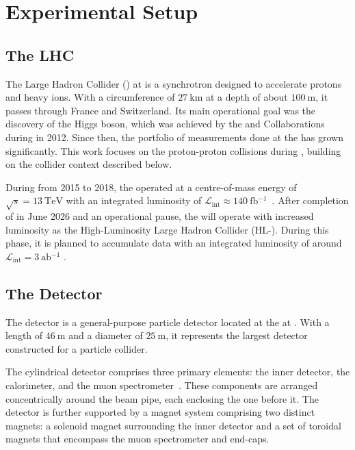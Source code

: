 \chapter{Experimental Setup}
\label{chap:experiment_setup}
\section{The LHC}
The Large Hadron Collider (\lhc) at \cern is a synchrotron designed to accelerate protons and heavy ions. With a circumference of $\qty{27}{\kilo\metre}$ at a depth of about $\qty{100}{\metre}$, it passes through France and Switzerland. Its main operational goal was the discovery of the Higgs boson, which was achieved by the \atlas and \cms Collaborations during \LHCruni \cite{atlas_higgs_discovery,cms_higgs_discovery} in 2012. Since then, the portfolio of measurements done at the \lhc has grown significantly.
This work focuses on the proton-proton collisions during \LHCrunii, building on the collider context described below.

During \LHCrunii from 2015 to 2018, the \lhc operated at a centre-of-mass energy of $\sqrt{s}=\qty{13}{\tera\electronvolt}$ with an integrated luminosity of $\mathcal{L}_{\text{int}}\approx \qty{140}{\femto\barn^{-1}}$~\cite{ATLAS:2019pzw}.
After completion of \LHCruniii in June 2026 and an operational pause, the \lhc will operate with increased luminosity as the High-Luminosity Large Hadron Collider (HL-\lhc). During this phase, it is planned to accumulate data with an integrated luminosity of around $\mathcal{L}_{\text{int}}=\qty{3}{\atto\barn^{-1}}$ \cite{Aberle:2749422}.


\section{The Detector}
The \atlas detector is a general-purpose particle detector located at the \lhc at \cern. With a length of $\qty{46}{\metre}$ and a diameter of $\qty{25}{\metre}$, it represents the largest detector constructed for a particle collider.

The cylindrical detector comprises three primary elements: the inner detector, the calorimeter, and the muon spectrometer~\cite{atlas_tdr,atlas_jinst}. These components are arranged concentrically around the beam pipe, each enclosing the one before it. The detector is further supported by a magnet system comprising two distinct magnets: a solenoid magnet surrounding the inner detector and a set of toroidal magnets that encompass the muon spectrometer and end-caps.

